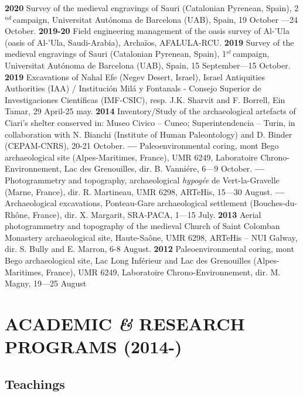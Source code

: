 \documentclass{article}
\begin{document}
\textbf{2020 }Survey of the medieval engravings of Sauri (Catalonian Pyrenean, Spain), 2${}^{nd\ }$campaign, Universitat Aut\'{o}noma de Barcelona (UAB), Spain, 19 October ---24 October.
\smallbreak
\textbf{2019-20 }Field engineering management of the oasis survey of Al-'Ula (oasis of Al-'Ula, Saudi-Arabia), Archa\"{i}os, AFALULA-RCU.
\smallbreak
\textbf{2019 }Survey of the medieval engravings of Sauri (Catalonian Pyrenean, Spain), 1${}^{st\ }$campaign, Universitat Aut\'{o}noma de Barcelona (UAB), Spain, 15 September---15 October.
\smallbreak
\textbf{2019 }Excavations of Nahal Efe (Negev Desert, Israel), Israel Antiquities Authorities (IAA) / Instituci\'{o}n Mil\'{a} y Fontanals - Consejo Superior de Investigaciones Cient\'{i}ficas (IMF-CSIC), resp. J.K. Sharvit and F. Borrell, Ein Tamar, 29 April-25 may.
\smallbreak
\textbf{2014 }Inventory/Study of the archaeological artefacts of Ciari's shelter conserved in: Museo Civico -- Cuneo; Superintendencia -- Turin, in collaboration with N. Bianchi (Institute of Human Paleontology) and D. Binder (CEPAM-CNRS), 20-21 October.
\smallbreak
\textbf{---  }Paleoenvironmental coring, mont Bego archaeological site (Alpes-Maritimes, France), UMR 6249, Laboratoire Chrono-Environnement, Lac des Grenouilles, dir. B. Vanni\'{e}re, 6---9 October.
\smallbreak
\textbf{---  }Photogrammetry and topography, archaeological \textit{hypog\'{e}e} de Vert-la-Gravelle (Marne, France), dir. R. Martineau, UMR 6298, ARTeHis, 15---30 August.
\smallbreak
\textbf{---  }Archaeological excavations, Ponteau-Gare archaeological settlement (Bouches-du-Rh\^{o}ne, France), dir. X. Margarit, SRA-PACA, 1---15 July.\smallbreak
\textbf{2013 }Aerial\textbf{ }photogrammetry and topography of the medieval Church of Saint Colomban Monastery archaeological site, Haute-Sa\^{o}ne, UMR 6298, ARTeHis -- NUI Galway, dir. S. Bully and E. Marron, 6-8 August.
\textbf{2012 }Paleoenvironmental coring, mont Bego archaeological site, Lac Long Inf\'{e}rieur and Lac des Grenouilles (Alpes-Maritimes, France), UMR 6249, Laboratoire Chrono-Environnement, dir. M. Magny, 19---25 August

\section{ACADEMIC \textit{\&} RESEARCH PROGRAMS (2014-)}

\subsection*{Teachings}
\end{document}
